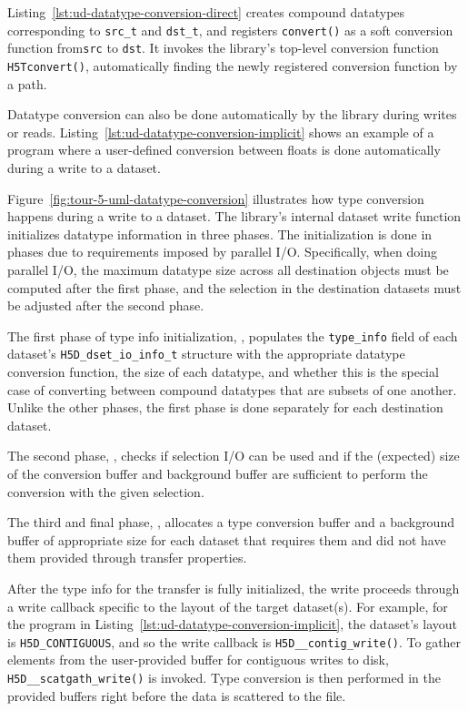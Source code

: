 Listing~\ref{lst:ud-datatype-conversion-direct} creates compound datatypes corresponding to \texttt{src\_t} and \texttt{dst\_t}, and registers \texttt{convert()} as a soft conversion function from\texttt{src} to \texttt{dst}. It invokes the library's top-level conversion function \texttt{H5Tconvert()}, automatically finding the newly registered conversion function by a path.

Datatype conversion can also be done automatically by the library during writes or reads. Listing~\ref{lst:ud-datatype-conversion-implicit} shows an example of a program where a user-defined conversion between floats is done automatically during a write to a dataset.

Figure~\ref{fig:tour-5-uml-datatype-conversion} illustrates how type conversion happens during a write to a dataset. The library's internal dataset write function  initializes datatype information in three phases. The initialization is done in phases due to requirements imposed by parallel I/O. Specifically, when doing parallel I/O, the maximum datatype size across all destination objects must be computed after the first phase, and the selection in the destination datasets must be adjusted after the second phase.

The first phase of type info initialization, , populates the \texttt{type\_info} field of each dataset's \texttt{H5D\_dset\_io\_info\_t} structure with the appropriate datatype conversion function, the size of each datatype, and whether this is the special case of converting between compound datatypes that are subsets of one another. Unlike the other phases, the first phase is done separately for each destination dataset.

The second phase, , checks if selection I/O can be used and if the (expected) size of the conversion buffer and background buffer are sufficient to perform the conversion with the given selection.

The third and final phase, , allocates a type conversion buffer and a background buffer of appropriate size for each dataset that requires them and did not have them provided through transfer properties.

After the type info for the transfer is fully initialized, the write proceeds through a write callback specific to the layout of the target dataset(s). For example, for the program in Listing~\ref{lst:ud-datatype-conversion-implicit}, the dataset's layout is \texttt{H5D\_CONTIGUOUS}, and so the write callback is \texttt{H5D\_\_contig\_write()}. To gather elements from the user-provided buffer for contiguous writes to disk, \texttt{H5D\_\_scatgath\_write()} is invoked. Type conversion is then performed in the provided buffers right before the data is scattered to the file.


